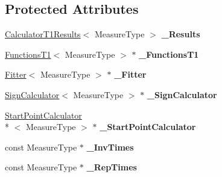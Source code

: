 \subsection*{Protected Attributes}
\begin{DoxyCompactItemize}
\item 
\hypertarget{class_ox_1_1_calculator_t1_afa4db4321ca3013a14bcbafbf2d6413a}{\hyperlink{struct_ox_1_1_calculator_t1_results}{Calculator\-T1\-Results}$<$ Measure\-Type $>$ {\bfseries \-\_\-\-Results}}\label{class_ox_1_1_calculator_t1_afa4db4321ca3013a14bcbafbf2d6413a}

\item 
\hypertarget{class_ox_1_1_calculator_t1_a3ad93308f17209680d93b727a90a23ee}{\hyperlink{class_ox_1_1_functions_t1}{Functions\-T1}$<$ Measure\-Type $>$ $\ast$ {\bfseries \-\_\-\-Functions\-T1}}\label{class_ox_1_1_calculator_t1_a3ad93308f17209680d93b727a90a23ee}

\item 
\hypertarget{class_ox_1_1_calculator_t1_a4863afe5f79555d5c6c31f6726d18578}{\hyperlink{class_ox_1_1_fitter}{Fitter}$<$ Measure\-Type $>$ $\ast$ {\bfseries \-\_\-\-Fitter}}\label{class_ox_1_1_calculator_t1_a4863afe5f79555d5c6c31f6726d18578}

\item 
\hypertarget{class_ox_1_1_calculator_t1_a6408fb35f4aeb4793bef57b491f8fa89}{\hyperlink{class_ox_1_1_sign_calculator}{Sign\-Calculator}$<$ Measure\-Type $>$ $\ast$ {\bfseries \-\_\-\-Sign\-Calculator}}\label{class_ox_1_1_calculator_t1_a6408fb35f4aeb4793bef57b491f8fa89}

\item 
\hypertarget{class_ox_1_1_calculator_t1_a6487bcc203c83566702a12a382ebe97f}{\hyperlink{class_ox_1_1_start_point_calculator}{Start\-Point\-Calculator}\\*
$<$ Measure\-Type $>$ $\ast$ {\bfseries \-\_\-\-Start\-Point\-Calculator}}\label{class_ox_1_1_calculator_t1_a6487bcc203c83566702a12a382ebe97f}

\item 
\hypertarget{class_ox_1_1_calculator_t1_ad97a2f1d28c9ffb68b9aa1f50bf85553}{const Measure\-Type $\ast$ {\bfseries \-\_\-\-Inv\-Times}}\label{class_ox_1_1_calculator_t1_ad97a2f1d28c9ffb68b9aa1f50bf85553}

\item 
\hypertarget{class_ox_1_1_calculator_t1_a3ca64a023adf3ab3770907057e5ae430}{const Measure\-Type $\ast$ {\bfseries \-\_\-\-Rep\-Times}}\label{class_ox_1_1_calculator_t1_a3ca64a023adf3ab3770907057e5ae430}


\end{DoxyCompactItemize}
